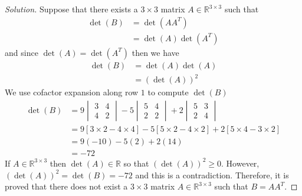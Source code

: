 \documentclass{article}
\newcommand{\R}{\mathbb{R}}
\theoremstyle{definition}
\begin{document}
\begin{proof}[Solution]
    Suppose that there exists a \(3\times3\) matrix \(A\in\R^{3\times3}\) such that
    \begin{align*}
        \det(B) &= \det(AA^T) \\
        &= \det(A)\det(A^T)
    \end{align*}
    and since \(\det(A)=\det(A^T)\) then we have
    \begin{align*}
        \det(B) &= \det(A)\det(A) \\
        &= (\det(A))^2
    \end{align*}
    We use cofactor expansion along row \(1\) to compute \(\det(B)\)
    \begin{align*}
        \det(B) 
        &= 9 \begin{vmatrix}
            3 & 4 \\
            4 & 2
          \end{vmatrix}
        - 5 \begin{vmatrix}
            5 & 4 \\
            2 & 2
          \end{vmatrix}
        + 2 \begin{vmatrix}
            5 & 3 \\
            2 & 4
          \end{vmatrix} \\
        &= 9[3\times2-4\times4] - 5[5\times2-4\times2] + 2[5\times4 - 3\times2] \\
        &= 9(-10) - 5(2) + 2(14) \\
        &= -72
    \end{align*}
    If \(A\in\R^{3\times3}\) then \(\det(A)\in\R\) so that \((\det(A))^2\geq0\).
    However, \((\det(A))^2 = \det(B) = -72\) and this is a contradiction.
    Therefore, it is proved that there does not exist a \(3\times3\) matrix
    \(A\in\R^{3\times3}\) such that \(B=AA^T\).
\end{proof}
\end{document}
